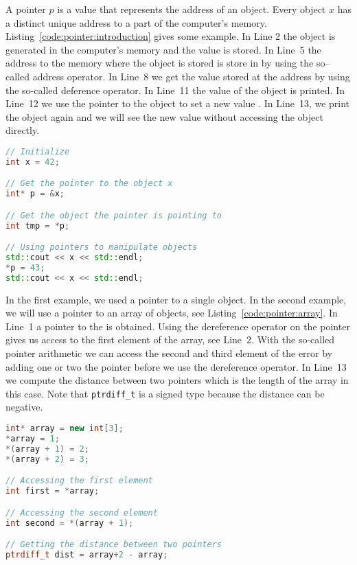 A pointer $p$ is a value that represents the address of an object. Every object $x$ has a distinct unique address to a part of the computer's memory. Listing~\ref{code:pointer:introduction} gives some example. In Line 2 the object  is generated in the computer's memory and the value  is stored. In Line~5 the address to the memory where the object  is stored is store in  by using the so--called \cpp{&} address operator. In Line~8 we get the value  stored at the address  by using the so-called deference operator. In Line~11 the value  of the object  is printed. In Line~12 we use the pointer  to the object  to set a new value . In Line~13, we print the object  again and we will see the new value  without accessing the object  directly.\\

\begin{lstlisting}[language=c++,caption={Introduction to pointers to objects.
\label{code:pointer:introduction}},float,floatplacement=tb]
// Initialize
int x = 42;

// Get the pointer to the object x
int* p = &x;

// Get the object the pointer is pointing to
int tmp = *p;

// Using pointers to manipulate objects
std::cout << x << std::endl;
*p = 43;
std::cout << x << std::endl;

\end{lstlisting}

In the first example, we used a pointer to a single object. In the second example, we will use a pointer to an array of objects, see Listing~\ref{code:pointer:array}. In Line~1 a pointer to the  is obtained. Using the dereference operator on the pointer gives us access to the first element of the array, see Line~2. With the so-called pointer arithmetic we can access the second and third element of the error by adding one or two the pointer before we use the dereference operator. In Line~13 we compute the distance between two pointers which is the length of the array in this case. Note that \lstinline|ptrdiff_t| is a signed type because the distance can be negative.\\


\begin{lstlisting}[language=c++,caption={Introduction to pointers to range of objects.
\label{code:pointer:array}},float,floatplacement=tb]
int* array = new int[3];
*array = 1;
*(array + 1) = 2;
*(array + 2) = 3;

// Accessing the first element
int first = *array;

// Accessing the second element
int second = *(array + 1);

// Getting the distance between two pointers
ptrdiff_t dist = array+2 - array;
\end{lstlisting}

